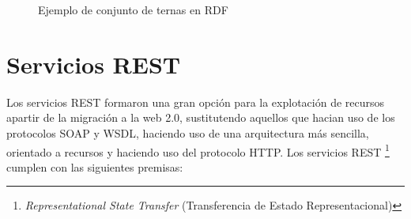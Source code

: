 \begin{figure}[!ht]
    \centering
    \caption{Ejemplo de conjunto de ternas en RDF} %
    \label{ejemplo_RDF_ternas}
\end{figure}
    
\section{Servicios REST}

Los servicios REST formaron una gran opci\'on para la explotaci\'on de recursos apartir de la migraci\'on a la web 2.0, sustitutendo aquellos que hacian uso de los protocolos SOAP y WSDL, haciendo uso de una arquitectura m\'as sencilla, orientado a recursos y haciendo uso del protocolo HTTP. Los servicios REST \footnote{\textit{Representational State Transfer} (Transferencia de Estado Representacional)} cumplen con las siguientes premisas: \cite{FeaturesREST}

